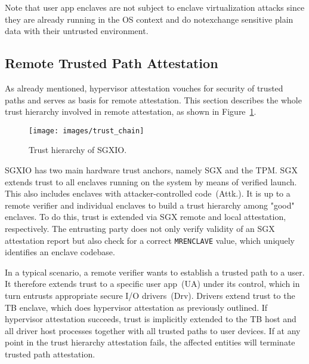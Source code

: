 \documentclass{sig-alternate-05-2015}
\begin{document}
Note that user app enclaves are not subject to enclave virtualization attacks since they are already running in the OS context and do notexchange sensitive plain data with their untrusted environment.

\subsection{Remote Trusted Path Attestation}

As already mentioned, hypervisor attestation vouches for security of trusted paths and serves as basis for remote attestation. 
This section describes the whole trust hierarchy involved in remote attestation, as shown in Figure~\ref{fig:trust_chain}.

\begin{figure}
\centering
\texttt{[image: images/trust\_chain]}
\caption{Trust hierarchy of SGXIO.}
\label{fig:trust_chain}
\end{figure}

SGXIO has two main hardware trust anchors, namely SGX and the TPM. 
SGX extends trust to all enclaves running on the system by means of verified launch. 
This also includes enclaves with attacker-controlled code~(Attk.). 
It is up to a remote verifier and individual enclaves to build a trust hierarchy among "good" enclaves. 
To do this, trust is extended via SGX remote and local attestation, respectively. 
The entrusting party does not only verify validity of an SGX attestation report but also check for a correct \verb!MRENCLAVE! value, which uniquely identifies an enclave codebase. 

In a typical scenario, a remote verifier wants to establish a trusted path to a user. 
It therefore extends trust to a specific user app~(UA) under its control, which in turn entrusts appropriate secure I/O drivers~(Drv). 
Drivers extend trust to the TB enclave, which does hypervisor attestation as previously outlined. 
If hypervisor attestation succeeds, trust is implicitly extended to the TB host and all driver host processes together with all trusted paths to user devices. 
If at any point in the trust hierarchy attestation fails, the affected entities will terminate trusted path attestation. 
\end{document}
